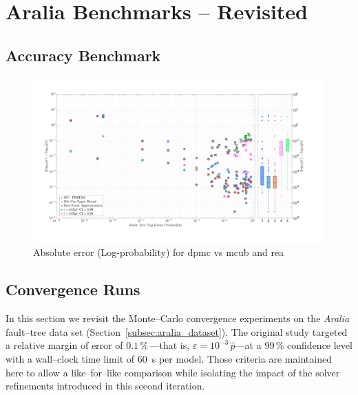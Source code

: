 \chapter{Aralia Benchmarks -- Revisited}

\section{Accuracy Benchmark}
\begin{landscape}
\begin{figure}[p]
    \centering
    \includegraphics[width=1\textwidth]{figs/aralia/rel_log_error_vs_prob.png}
    \caption{Absolute error (Log-probability) for \acrfull{dpmc} vs \acrfull{mcub} and \acrfull{rea}}
    \label{fig:canopy_rel_error_plot_revies}
\end{figure}
\end{landscape}

\section{Convergence Runs}
In this section we revisit the Monte--Carlo convergence experiments on the \emph{Aralia} fault--tree data set (Section~\ref{subsec:aralia_dataset}).  The original study targeted a relative margin of error of $0.1\,\%$\,---that is, $\varepsilon = 10^{-3}\,\hat{p}$---at a $99\,\%$ confidence level with a wall--clock time limit of 60~s per model.  Those criteria are maintained here to allow a like--for--like comparison while isolating the impact of the solver refinements introduced in this second iteration.


